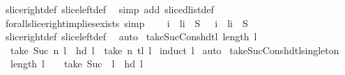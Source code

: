 \begin{isabellebody}
\ slice{\isacharunderscore}right{\isacharunderscore}def\ slice{\isacharunderscore}left{\isacharunderscore}def\ \isanewline
{}\isamarkupfalse%
\ {\isacharparenleft}simp\ add{\isacharcolon}\ slice{\isacharunderscore}dlist{\isacharunderscore}def{\isacharparenright}%
\endisatagproof
{\isafoldproof}%
%
\isadelimproof
\isanewline
%
\endisadelimproof
\isanewline
{}\isamarkupfalse%
\ forall{\isacharunderscore}slice{\isacharunderscore}right{\isacharunderscore}implies{\isacharunderscore}exists\ {\isacharbrackleft}simp{\isacharbrackright}{\isacharcolon}\ \isanewline
\ \ {\isachardoublequoteopen}{\isasymforall}\ i\ {\isachardot}\ l{\isasymdagger}{\isachardot}{\isachardot}i\ {\isasymin}\ S\ {\isasymLongrightarrow}\ {\isasymexists}\ i\ {\isachardot}\ l{\isasymdagger}{\isachardot}{\isachardot}{\isacharparenleft}i{\isacharminus}{}{\isacharparenright}\ {\isasymin}\ S{\isachardoublequoteclose}\isanewline
%
\isadelimproof
%
\endisadelimproof
%
\isatagproof
{}\isamarkupfalse%
\ slice{\isacharunderscore}right{\isacharunderscore}def\ slice{\isacharunderscore}left{\isacharunderscore}def\ \isanewline
{}\isamarkupfalse%
\ auto%
\endisatagproof
{\isafoldproof}%
%
\isadelimproof
\isanewline
%
\endisadelimproof
\isanewline
\isanewline
\isanewline
{}\isamarkupfalse%
\ take{\isacharunderscore}Suc{\isacharunderscore}Cons{\isacharunderscore}hd{\isacharunderscore}tl{\isacharcolon}\ {\isachardoublequoteopen}length\ l\ {\isachargreater}\ {}\ {\isasymLongrightarrow}\ \isanewline
\ \ take\ {\isacharparenleft}Suc\ n{\isacharparenright}\ l\ {\isacharequal}\ hd\ l\ {\isacharhash}\ {\isacharparenleft}take\ n\ {\isacharparenleft}tl\ l{\isacharparenright}{\isacharparenright}{\isachardoublequoteclose}\isanewline
%
\isadelimproof
%
\endisadelimproof
%
\isatagproof
{}\isamarkupfalse%
\ {\isacharparenleft}induct\ l{\isacharparenright}\isanewline
{}\isamarkupfalse%
\ auto%
\endisatagproof
{\isafoldproof}%
%
\isadelimproof
\isanewline
%
\endisadelimproof
\isanewline
{}\isamarkupfalse%
\ take{\isacharunderscore}Suc{\isacharunderscore}Cons{\isacharunderscore}hd{\isacharunderscore}tl{\isacharunderscore}singleton{\isacharcolon}\ \isanewline
\ \ {\isachardoublequoteopen}length\ l\ {\isachargreater}\ {}\ {\isasymLongrightarrow}\ take\ {\isacharparenleft}Suc\ {}{\isacharparenright}\ l\ {\isacharequal}\ {\isacharbrackleft}hd\ l{\isacharbrackright}{\isachardoublequoteclose}\isanewline
%
\isadelimproof
%
\endisadelimproof
%
\isatagproof
{}\isamarkupfalse%

\end{isabellebody}
